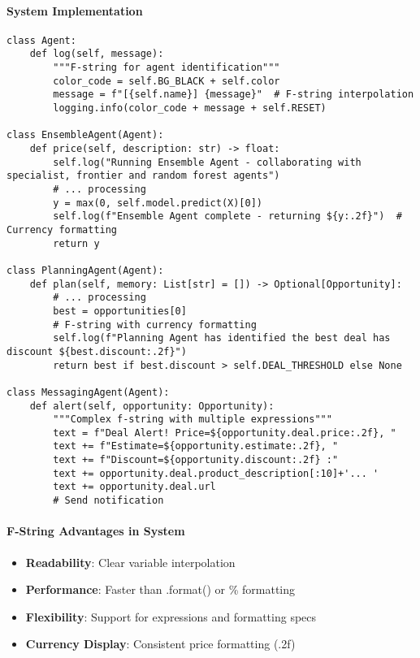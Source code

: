 \paragraph{System Implementation}
\begin{lstlisting}[caption=F-Strings in Agent System]
class Agent:
    def log(self, message):
        """F-string for agent identification"""
        color_code = self.BG_BLACK + self.color
        message = f"[{self.name}] {message}"  # F-string interpolation
        logging.info(color_code + message + self.RESET)

class EnsembleAgent(Agent):
    def price(self, description: str) -> float:
        self.log("Running Ensemble Agent - collaborating with specialist, frontier and random forest agents")
        # ... processing
        y = max(0, self.model.predict(X)[0])
        self.log(f"Ensemble Agent complete - returning ${y:.2f}")  # Currency formatting
        return y

class PlanningAgent(Agent):
    def plan(self, memory: List[str] = []) -> Optional[Opportunity]:
        # ... processing
        best = opportunities[0]
        # F-string with currency formatting
        self.log(f"Planning Agent has identified the best deal has discount ${best.discount:.2f}")
        return best if best.discount > self.DEAL_THRESHOLD else None

class MessagingAgent(Agent):
    def alert(self, opportunity: Opportunity):
        """Complex f-string with multiple expressions"""
        text = f"Deal Alert! Price=${opportunity.deal.price:.2f}, "
        text += f"Estimate=${opportunity.estimate:.2f}, "
        text += f"Discount=${opportunity.discount:.2f} :"
        text += opportunity.deal.product_description[:10]+'... '
        text += opportunity.deal.url
        # Send notification
\end{lstlisting}

\paragraph{F-String Advantages in System}
\begin{itemize}
\item \textbf{Readability}: Clear variable interpolation
\item \textbf{Performance}: Faster than .format() or \% formatting
\item \textbf{Flexibility}: Support for expressions and formatting specs
\item \textbf{Currency Display}: Consistent price formatting (.2f)
\end{itemize}


